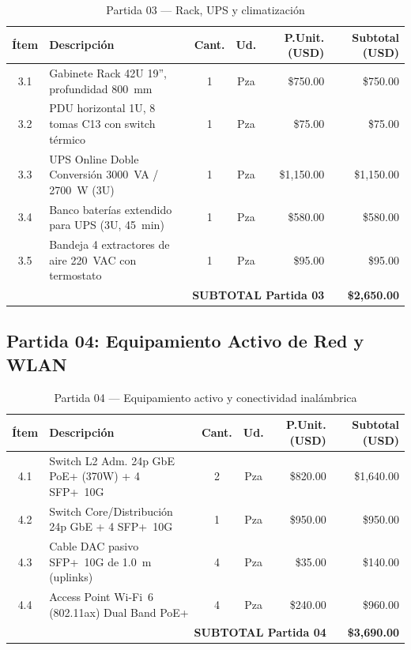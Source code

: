 \begin{table}[H]
\centering
\caption{Partida 03 --- Rack, UPS y climatización}
\small
\begin{tabularx}{\textwidth}{@{} c X c c r r @{}}
\toprule
\textbf{Ítem} & \textbf{Descripción} & \textbf{Cant.} & \textbf{Ud.} & \textbf{P.Unit. (USD)} & \textbf{Subtotal (USD)} \\
\midrule
3.1 & Gabinete Rack 42U 19'', profundidad 800~mm            & 1 & Pza & \$750.00  & \$750.00  \\
3.2 & PDU horizontal 1U, 8 tomas C13 con switch térmico     & 1 & Pza & \$75.00   & \$75.00   \\
3.3 & UPS Online Doble Conversión 3000~VA / 2700~W (3U)     & 1 & Pza & \$1,150.00 & \$1,150.00 \\
3.4 & Banco baterías extendido para UPS (3U, 45~min)        & 1 & Pza & \$580.00  & \$580.00  \\
3.5 & Bandeja 4 extractores de aire 220~VAC con termostato  & 1 & Pza & \$95.00   & \$95.00   \\
\midrule
\multicolumn{5}{r}{\textbf{SUBTOTAL Partida 03}} & \textbf{\$2,650.00} \\
\bottomrule
\end{tabularx}
\label{tab:partida03}
\end{table}

\subsection{Partida 04: Equipamiento Activo de Red y WLAN}

\begin{table}[H]
\centering
\caption{Partida 04 --- Equipamiento activo y conectividad inalámbrica}
\small
\begin{tabularx}{\textwidth}{@{} c X c c r r @{}}
\toprule
\textbf{Ítem} & \textbf{Descripción} & \textbf{Cant.} & \textbf{Ud.} & \textbf{P.Unit. (USD)} & \textbf{Subtotal (USD)} \\
\midrule
4.1 & Switch L2 Adm. 24p GbE PoE+ (370W) + 4 SFP+~10G  & 2 & Pza & \$820.00 & \$1,640.00 \\
4.2 & Switch Core/Distribución 24p GbE + 4 SFP+~10G     & 1 & Pza & \$950.00 & \$950.00   \\
4.3 & Cable DAC pasivo SFP+~10G de 1.0~m (uplinks)      & 4 & Pza & \$35.00  & \$140.00   \\
4.4 & Access Point Wi-Fi~6 (802.11ax) Dual Band PoE+    & 4 & Pza & \$240.00 & \$960.00   \\
\midrule
\multicolumn{5}{r}{\textbf{SUBTOTAL Partida 04}} & \textbf{\$3,690.00} \\
\bottomrule
\end{tabularx}
\label{tab:partida04}
\end{table}

